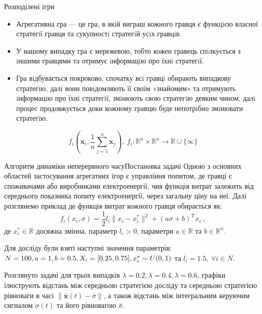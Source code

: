 \documentclass[unicode]{beamer}
\begin{document}
\begin{frame}{Розподілені ігри}
\begin{itemize}

\item Агрегативна гра --- це гра, в якiй виграш кожного гравця є функцiєю власної стратегiї гравця та сукупностi стратегiй усiх гравцiв.

\item У нашому випадку гра є мережевою, тобто кожен гравець спiлкується з iншими гравцями та отримує iнформацiю про їхнi стратегiї.

\item Гра вiдбувається покроково, спочатку всi гравцi обирають випадкову стратегiю, далi вони повiдомляють її своїм «знайомим» та отримують iнформацiю про їхнi стратегiї, змiнюють свою стратегiю деяким чином, далi процес продовжується доки кожному гравцю буде непотрiбно змiнювати стратегiю.

\end{itemize}
$$f_i \left(\mathbf{x}_i, \frac{1}{n} \sum_{j=1}^{n} \mathbf{x}_j\right),~f_i: \mathbb{R}^n \times \mathbb{R}^n \rightarrow \mathbb{R} \cup \{ \infty \}$$
\end{frame}

\begin{frame}{Алгоритм динаміки неперервного часу}{Постановка задачі}
    Одною з основних областей застосування агрегатних ігор є
управління попитом, де гравці є споживачами або виробниками електроенергії, чия функція витрат залежить від середнього показника попиту електроенергії, через загальну ціну на неї. Далі розглянемо приклад де функція витрат кожного гравця обирається як:
\begin{equation*}
    f_i(x_i,\sigma)=\frac{1}{2}l_i\|x_i-x_i^*\|^2+(a\sigma+b)^\mathrm{T}x_i~,
\end{equation*}
де $x_i^* \in \mathbb{R}$ досяжна змінна, параметр $l_i>0$, параметри $a \in \mathbb{R}$ та $b \in \mathbb{R}^n$.

Для досліду були взяті наступні значення параметрів: $N=100, a=1,\\ b=0.5, X_i=[0.25, 0.75], x_i^* \sim U(0,1)$ та $l_i = 1.5, ~\forall i\in N$.

Розглянуто задачі для трьох випадків $\lambda=0.2, \lambda=0.4, \lambda=0.6$, графіки ілюструють відстань між середньою стратегією досліду та середньою стратегією рівноваги в часі $\|\bar{\mathbf{x}}(t) - \bar{\sigma}\|$, а також відстань між інтегральним керуючим сигналом $\sigma(t)$ та його рівновагою $\bar{\sigma}$.
\end{frame}
\end{document}
